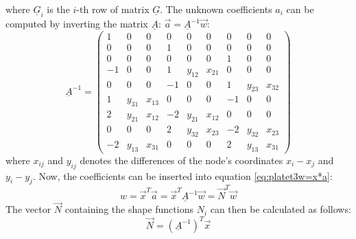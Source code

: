   where $\underline{G}_i$ is the $i$-th row of matrix $\underline{G}$.
  The unknown coefficients $a_i$ can be computed by inverting the matrix $\underline{A}$: $\vec{a} = \underline{A}^{-1} \vec{w}$:
  \begin{equation}
  \underline{A}^{-1} = \begin{pmatrix}
  1& 0& 0& 0& 0& 0& 0& 0& 0\\
  0& 0& 0& 1& 0& 0& 0& 0& 0\\
  0& 0& 0& 0& 0& 0& 1& 0& 0\\
  -1& 0& 0& 1& y_{12}& x_{21}& 0& 0& 0\\
  0& 0& 0& -1& 0& 0& 1& y_{23}& x_{32}\\
  1& y_{31}& x_{13}& 0& 0& 0& -1& 0& 0\\
  2& y_{21}& x_{12}& -2& y_{21}& x_{12}& 0& 0& 0\\
  0& 0& 0& 2& y_{32}& x_{23}& -2& y_{32}& x_{23}\\
  -2& y_{13}& x_{31}& 0& 0& 0& 2& y_{13}& x_{31}
  \end{pmatrix}
  \end{equation}
  where $x_{ij}$ and $y_{ij}$ denotes the differences of the node's coordinates $x_i-x_j$ and $y_i-y_j$.
  Now, the coefficients can be inserted into equation \ref{eq:platet3w=x*a}:
  \begin{equation}\label{eq:w=NT*vecw}
  w = \vec{x}^T \vec{a} = \vec{x}^T \underline{A}^{-1} \vec{w} = \vec{N}^T \vec{w}
  \end{equation}
  The vector $\vec{N}$ containing the shape functions $N_i$ can then be calculated as follows:
  \begin{equation}
  \vec{N} = \left(\underline{A}^{-1}\right)^T \vec{x}
  \end{equation}
  
